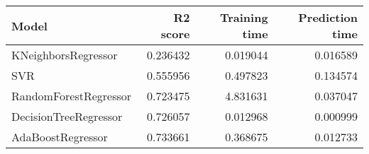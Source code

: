 \begin{tabular}{lrrr}
\toprule
Model & R2 score & Training time & Prediction time \\
\midrule
KNeighborsRegressor & 0.236432 & 0.019044 & 0.016589 \\
SVR & 0.555956 & 0.497823 & 0.134574 \\
RandomForestRegressor & 0.723475 & 4.831631 & 0.037047 \\
DecisionTreeRegressor & 0.726057 & 0.012968 & 0.000999 \\
AdaBoostRegressor & 0.733661 & 0.368675 & 0.012733 \\
\bottomrule
\end{tabular}
